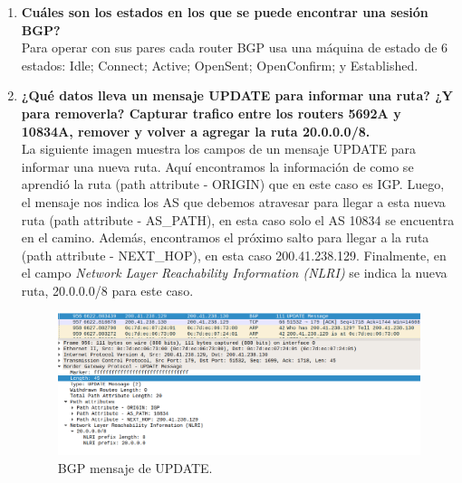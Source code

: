 \documentclass[letterpaper,12pt]{article}
\begin{document}
\begin{enumerate}
		\item \textbf{Cuáles son los estados en los que se puede encontrar una sesión BGP?}\\
		Para operar con sus pares cada router BGP usa una máquina de estado de 6 estados: Idle; Connect; Active; OpenSent; OpenConfirm; y Established.
	
		\item \textbf{¿Qué datos lleva un mensaje UPDATE para informar una ruta? ¿Y para removerla? Capturar trafico entre los routers 5692A y 10834A, remover y volver a agregar la ruta 20.0.0.0/8.}\\
		La siguiente imagen muestra los campos de un mensaje UPDATE para informar una nueva ruta. Aquí encontramos la información de como se aprendió la ruta (path attribute - ORIGIN) que en este caso es IGP. Luego, el mensaje nos indica los AS que debemos atravesar para llegar a esta nueva ruta (path attribute - AS\_PATH), en esta caso solo el AS 10834 se encuentra en el camino. Además, encontramos el próximo salto para llegar a la ruta (path attribute - NEXT\_HOP), en esta caso 200.41.238.129. Finalmente, en el campo \textit{Network Layer Reachability Information (NLRI)} se indica la nueva ruta, 20.0.0.0/8 para este caso.

		\begin{figure}[H]
			\centering \includegraphics[width=1\columnwidth]{figure/bgp-update.png}
			\caption{
				\label{fig:samplesetup} %
				BGP mensaje de UPDATE.
			}
		\end{figure}
		

\end{enumerate}
\end{document}
